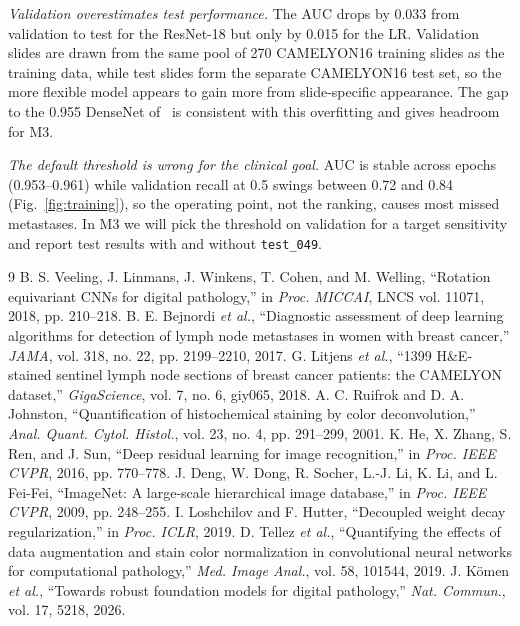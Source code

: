 \documentclass[conference]{IEEEtran}
\begin{document}
\textit{Validation overestimates test performance.} The AUC drops by 0.033 from validation to test for the ResNet-18 but only by 0.015 for the LR. Validation slides are drawn from the same pool of 270 CAMELYON16 training slides as the training data, while test slides form the separate CAMELYON16 test set, so the more flexible model appears to gain more from slide-specific appearance. The gap to the 0.955 DenseNet of~\cite{veeling2018} is consistent with this overfitting and gives headroom for M3.

\textit{The default threshold is wrong for the clinical goal.} AUC is stable across epochs (0.953--0.961) while validation recall at 0.5 swings between 0.72 and 0.84 (Fig.~\ref{fig:training}), so the operating point, not the ranking, causes most missed metastases. In M3 we will pick the threshold on validation for a target sensitivity and report test results with and without \texttt{test\_049}.

\begin{thebibliography}{9}
 B. S. Veeling, J. Linmans, J. Winkens, T. Cohen, and M. Welling, ``Rotation equivariant CNNs for digital pathology,'' in \textit{Proc. MICCAI}, LNCS vol. 11071, 2018, pp. 210--218.
 B. E. Bejnordi \textit{et al.}, ``Diagnostic assessment of deep learning algorithms for detection of lymph node metastases in women with breast cancer,'' \textit{JAMA}, vol. 318, no. 22, pp. 2199--2210, 2017.
 G. Litjens \textit{et al.}, ``1399 H\&E-stained sentinel lymph node sections of breast cancer patients: the CAMELYON dataset,'' \textit{GigaScience}, vol. 7, no. 6, giy065, 2018.
 A. C. Ruifrok and D. A. Johnston, ``Quantification of histochemical staining by color deconvolution,'' \textit{Anal. Quant. Cytol. Histol.}, vol. 23, no. 4, pp. 291--299, 2001.
 K. He, X. Zhang, S. Ren, and J. Sun, ``Deep residual learning for image recognition,'' in \textit{Proc. IEEE CVPR}, 2016, pp. 770--778.
 J. Deng, W. Dong, R. Socher, L.-J. Li, K. Li, and L. Fei-Fei, ``ImageNet: A large-scale hierarchical image database,'' in \textit{Proc. IEEE CVPR}, 2009, pp. 248--255.
 I. Loshchilov and F. Hutter, ``Decoupled weight decay regularization,'' in \textit{Proc. ICLR}, 2019.
 D. Tellez \textit{et al.}, ``Quantifying the effects of data augmentation and stain color normalization in convolutional neural networks for computational pathology,'' \textit{Med. Image Anal.}, vol. 58, 101544, 2019.
 J. K\"omen \textit{et al.}, ``Towards robust foundation models for digital pathology,'' \textit{Nat. Commun.}, vol. 17, 5218, 2026.
\end{thebibliography}
\end{document}
